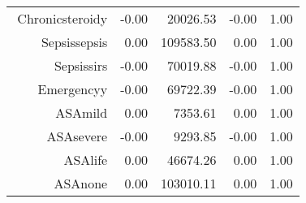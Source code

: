 \begin{tabular}{rrrrr}
$$  Chronic\-steroid\-y & -0.00 & 20026.53 & -0.00 & 1.00 \\ 
  Sepsis\-sepsis & 0.00 & 109583.50 & 0.00 & 1.00 \\ 
  Sepsis\-sirs & -0.00 & 70019.88 & -0.00 & 1.00 \\ 
  Emergency\-y & -0.00 & 69722.39 & -0.00 & 1.00 \\ 
  ASA\-mild & 0.00 & 7353.61 & 0.00 & 1.00 \\ 
  ASA\-severe & -0.00 & 9293.85 & -0.00 & 1.00 \\ 
  ASA\-life & 0.00 & 46674.26 & 0.00 & 1.00 \\ 
  ASA\-none & 0.00 & 103010.11 & 0.00 & 1.00 \\ 
   \hline
\end{tabular}

